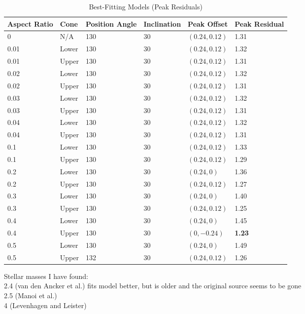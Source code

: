 \documentclass[a4paper]{tufte-handout}
\begin{document}
\begin{table}[p]
\label{tab:best peaks}
\caption{Best-Fitting Models (Peak Residuals)}
\begin{tabu} to \textwidth {X[r]X[r]X[r]X[r]X[r]X[r]}
  \toprule
  Aspect Ratio & Cone & Position Angle & Inclination &	Peak Offset   & Peak Residual\\
              & N/A  & 130            & 30          & $(0.24, 0.12)$ &	1.31\\
  0.01         & Lower& 130            & 30          & $(0.24, 0.12)$ &	1.32\\
  0.01         & Upper& 130            & 30          & $(0.24, 0.12)$ &	1.31\\
  0.02         & Lower& 130            & 30          & $(0.24, 0.12)$ &	1.32\\
  0.02         & Upper& 130            & 30          & $(0.24, 0.12)$ &	1.31\\
  0.03         & Lower& 130            & 30          & $(0.24, 0.12)$ &	1.32\\
  0.03         & Upper& 130            & 30          & $(0.24, 0.12)$ &	1.31\\
  0.04         & Lower& 130            & 30          & $(0.24, 0.12)$ &	1.32\\
  0.04         & Upper& 130            & 30          & $(0.24, 0.12)$ &	1.31\\
  0.1          & Lower& 130            & 30          & $(0.24, 0.12)$ &	1.33\\
  0.1          & Upper& 130            & 30          & $(0.24, 0.12)$ &	1.29\\
  0.2          & Lower& 130            & 30          & $(0.24, 0)   $ &	1.36\\
  0.2          & Upper& 130            & 30          & $(0.24, 0.12)$ &	1.27\\
  0.3          & Lower& 130            & 30          & $(0.24, 0)   $ &	1.40\\
  0.3          & Upper& 130            & 30          & $(0.24, 0.12)$ &	1.25\\
  0.4          & Lower& 130            & 30          & $(0.24, 0)   $ &	1.45\\
  0.4          & Upper& 130            & 30          & $(0, -0.24)  $ &	\textbf{1.23}\\
  0.5          & Lower& 130            & 30          & $(0.24, 0)   $ &	1.49\\
  0.5          & Upper& 132            & 30          & $(0.24, 0.12)$ &	1.26\\
\end{tabu}
\end{table}

 Stellar masses I have found:\\
  2.4 (van den Ancker et al.) fits model better, but is older and the original source seems to be gone\\
  2.5 (Manoi et al.)\\
  4  (Levenhagen and Leister)

\hrulefill




\end{document}
